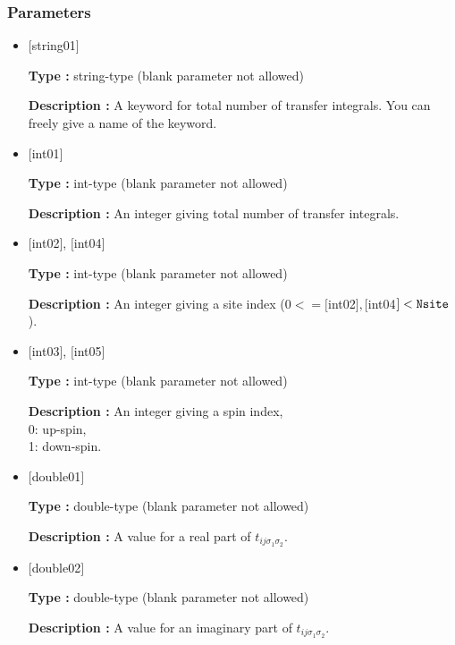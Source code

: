 \subsubsection{Parameters}
 \begin{itemize}

   \item  $[$string01$]$
   
    {\bf Type :} string-type (blank parameter not allowed)

   {\bf Description :} A keyword for total number of transfer integrals. You can freely give a name of the keyword.

   \item  $[$int01$]$
   
    {\bf Type :} int-type (blank parameter not allowed)

   {\bf Description :} An integer giving total number of transfer integrals.

  \item  $[$int02$]$, $[$int04$]$

 {\bf Type :} int-type (blank parameter not allowed)

{\bf Description :} An integer giving a site index ($0<= [$int02$],  [$int04$]<\verb|Nsite|$).

  \item  $[$int03$]$, $[$int05$]$

 {\bf Type :} int-type (blank parameter not allowed)

{\bf Description :} An integer giving a spin index,\\
0: up-spin,\\
1: down-spin.

 \item  $[$double01$]$
   
   {\bf Type :} double-type (blank parameter not allowed)

  {\bf Description :}  A value for a real part of $t_{ij\sigma_1\sigma_2}$.

 \item  $[$double02$]$
   
   {\bf Type :} double-type (blank parameter not allowed)

  {\bf Description :} A value for an imaginary part of $t_{ij\sigma_1\sigma_2}$.
\end{itemize}

